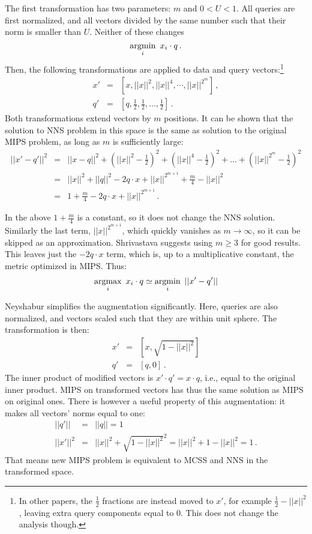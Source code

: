 The first transformation has two parameters: $m$ and $0 < U < 1$. All queries
are first normalized, and all vectors divided by the same number such that
their norm is smaller than $U$. Neither of these changes
$$ \operatorname*{argmin}_{i}\ x_i \cdot q\,.$$ 
Then, the following transformations are applied to data
and query vectors:\footnote{In other papers, the $\frac{1}{2}$ fractions are
instead moved to $x'$, for example $\frac{1}{2} - ||x||^2$, leaving extra
query components equal to 0. This does not change the analysis though.}
\begin{eqnarray*}
x' & = & [x, ||x||^2, ||x||^4, \cdots, ||x||^{2^m}] \,, \\
q' & = & [q, \frac{1}{2}, \frac{1}{2}, \dots, \frac{1}{2}] \,. 
\end{eqnarray*}
Both transformations extend vectors by $m$ positions. It can be shown that
the solution to NNS problem in this space is the same as solution to the original
MIPS problem, as long as $m$ is sufficiently large:
\begin{eqnarray*}
||x' - q'||^2 & = & ||x - q||^2 +
\left (||x||^2 - \frac{1}{2} \right )^2 + \left (||x||^4 - \frac{1}{2} \right )^2 + \dots + 
\left (||x||^{2^m} - \frac{1}{2} \right )^2 \\
& = & ||x||^2 + ||q||^2 - 2 q \cdot x + ||x||^{2^{m+1}} + \frac{m}{4} - ||x||^2 \\
& = & 1 + \frac{m}{4} - 2 q \cdot x + ||x||^{2^{m+1}} \,.
\end{eqnarray*}

In the above $1 + \frac{m}{4} $ is a constant, so it does not change the NNS solution. Similarly  the last term, 
$||x||^{2^{m+1}}$,  which quickly vanishes as $m \to \infty$, so it can be skipped
as an approximation. Shrivastava suggests using $m \ge 3$ for good results.
This leaves just the $ - 2 q \cdot x $ term, which is, up to a multiplicative
constant, the metric optimized in MIPS.
Thus:
$$
\operatorname*{argmax}_{i}\ x_i \cdot q \simeq \operatorname*{argmin}_{i}\ ||x' - q'||
$$

Neyshabur simplifies the augmentation significantly. Here, queries are also
normalized, and vectors scaled such that they are within unit sphere. The
transformation is then:
\begin{eqnarray*}
x' & = & [x, \sqrt{1 - ||x||^2}] \\
q' & = &  [q, 0] \,.
\end{eqnarray*}
The inner product of modified vectors is $x' \cdot q' = x \cdot q$, i.e., equal
to the original inner product. MIPS on transformed vectors has thus the same
solution as MIPS on original ones. There is however a useful property of this
augmentation: it makes all vectors' norms equal to one: 
\begin{eqnarray*}
||q'|| & = & ||q|| = 1 \\
||x'||^2 & = & ||x||^2 + \sqrt{1 - ||x||^2}^2 = ||x||^2 + 1 - ||x||^2 = 1 \,. 
\end{eqnarray*}
That means new MIPS problem is equivalent to MCSS and NNS in the transformed
space.

